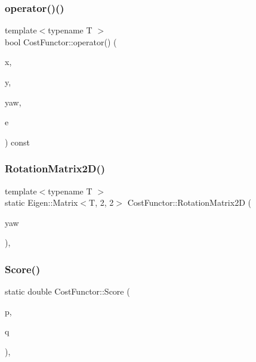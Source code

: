 \mbox{\label{structCostFunctor_a07e825ed38e78e3a9f530b139e6b8155}} 
\subsubsection{\texorpdfstring{operator()()}{operator()()}}
{\footnotesize\ttfamily template$<$typename T $>$ \\
bool Cost\+Functor\+::operator() (\begin{DoxyParamCaption}\item[{const T $\ast$const}]{x,  }\item[{const T $\ast$const}]{y,  }\item[{const T $\ast$const}]{yaw,  }\item[{T $\ast$}]{e }\end{DoxyParamCaption}) const\hspace{0.3cm}{\ttfamily [inline]}}

\mbox{\label{structCostFunctor_ae0785d2abc318696cb6dc01fac237881}} 
\subsubsection{\texorpdfstring{Rotation\+Matrix2\+D()}{RotationMatrix2D()}}
{\footnotesize\ttfamily template$<$typename T $>$ \\
static Eigen\+::\+Matrix$<$T, 2, 2$>$ Cost\+Functor\+::\+Rotation\+Matrix2D (\begin{DoxyParamCaption}\item[{T}]{yaw }\end{DoxyParamCaption})\hspace{0.3cm}{\ttfamily [inline]}, {\ttfamily [static]}}

\mbox{\label{structCostFunctor_a944445b87b51172a0d0037504e9dcadd}} 
\subsubsection{\texorpdfstring{Score()}{Score()}}
{\footnotesize\ttfamily static double Cost\+Functor\+::\+Score (\begin{DoxyParamCaption}\item[{\hyperlink{classNDTCell}{N\+D\+T\+Cell} $\ast$}]{p,  }\item[{\hyperlink{classNDTCell}{N\+D\+T\+Cell} $\ast$}]{q }\end{DoxyParamCaption})\hspace{0.3cm}{\ttfamily [inline]}, {\ttfamily [static]}}



